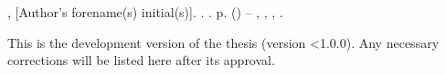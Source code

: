 
\begin{errata}[\errataname]
, [Author's forename(s) initial(s)]. \textbf{\imprimirtitulo}. {\imprimirdata}. {\thelastpage}p. {\imprimirtipotrabalho}  (\imprimirtituloacademico) -- {\imprimirescola}, {\imprimiruniversidade}, {\imprimirlocal}, {\imprimirdata}.
\smallskip

This is the development version of the thesis (version \textless1.0.0).
Any necessary corrections will be listed here after its approval.

\end{errata}



